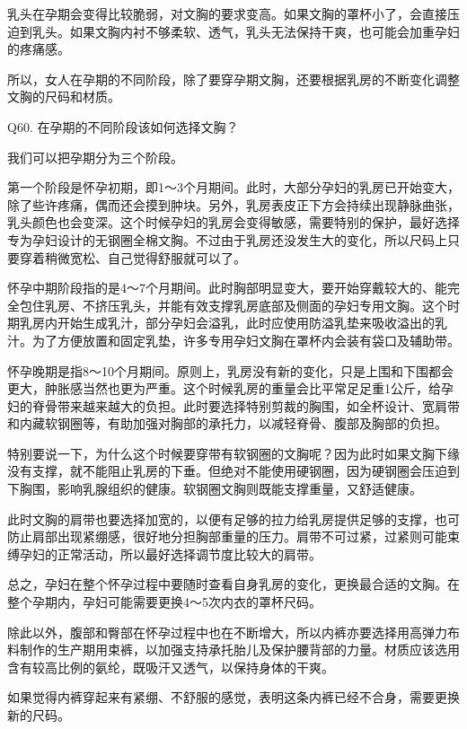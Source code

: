 \documentclass[12pt,UTF8]{ctexbook}
\begin{document}
乳头在孕期会变得比较脆弱，对文胸的要求变高。如果文胸的罩杯小了，会直接压迫到乳头。如果文胸内衬不够柔软、透气，乳头无法保持干爽，也可能会加重孕妇的疼痛感。

所以，女人在孕期的不同阶段，除了要穿孕期文胸，还要根据乳房的不断变化调整文胸的尺码和材质。





Q60. 在孕期的不同阶段该如何选择文胸？


我们可以把孕期分为三个阶段。

第一个阶段是怀孕初期，即1～3个月期间。此时，大部分孕妇的乳房已开始变大，除了些许疼痛，偶而还会摸到肿块。另外，乳房表皮正下方会持续出现静脉曲张，乳头颜色也会变深。这个时候孕妇的乳房会变得敏感，需要特别的保护，最好选择专为孕妇设计的无钢圈全棉文胸。不过由于乳房还没发生大的变化，所以尺码上只要穿着稍微宽松、自己觉得舒服就可以了。

怀孕中期阶段指的是4～7个月期间。此时胸部明显变大，要开始穿戴较大的、能完全包住乳房、不挤压乳头，并能有效支撑乳房底部及侧面的孕妇专用文胸。这个时期乳房内开始生成乳汁，部分孕妇会溢乳，此时应使用防溢乳垫来吸收溢出的乳汁。为了方便放置和固定乳垫，许多专用孕妇文胸在罩杯内会装有袋口及辅助带。

怀孕晚期是指8～10个月期间。原则上，乳房没有新的变化，只是上围和下围都会更大，肿胀感当然也更为严重。这个时候乳房的重量会比平常足足重1公斤，给孕妇的脊骨带来越来越大的负担。此时要选择特别剪裁的胸围，如全杯设计、宽肩带和内藏软钢圈等，有助加强对胸部的承托力，以减轻脊骨、腹部及胸部的负担。


特别要说一下，为什么这个时候要穿带有软钢圈的文胸呢？因为此时如果文胸下缘没有支撑，就不能阻止乳房的下垂。但绝对不能使用硬钢圈，因为硬钢圈会压迫到下胸围，影响乳腺组织的健康。软钢圈文胸则既能支撑重量，又舒适健康。

此时文胸的肩带也要选择加宽的，以便有足够的拉力给乳房提供足够的支撑，也可防止肩部出现紧绷感，很好地分担胸部重量的压力。肩带不可过紧，过紧则可能束缚孕妇的正常活动，所以最好选择调节度比较大的肩带。

总之，孕妇在整个怀孕过程中要随时查看自身乳房的变化，更换最合适的文胸。在整个孕期内，孕妇可能需要更换4～5次内衣的罩杯尺码。

除此以外，腹部和臀部在怀孕过程中也在不断增大，所以内裤亦要选择用高弹力布料制作的生产期用束裤，以加强支持承托胎儿及保护腰背部的力量。材质应该选用含有较高比例的氨纶，既吸汗又透气，以保持身体的干爽。

如果觉得内裤穿起来有紧绷、不舒服的感觉，表明这条内裤已经不合身，需要更换新的尺码。
\end{document}
